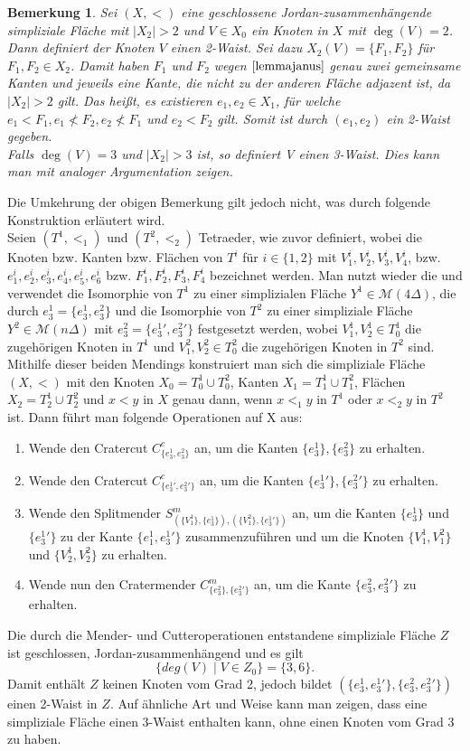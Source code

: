 \documentclass[12pt,titlepage,twoside,cleardoublepage]{article}
\theoremstyle{nummermitklammern}
\newtheorem{bemerkung}[temp]{Bemerkung}
\newtheorem{bemerkung}[zahl]{Bemerkung}
\numberwithin{equation}{section}
\begin{document}
\begin{bemerkung}
Sei $(X,<)$ eine geschlossene Jordan-zusammenhängende simpliziale Fläche mit $\vert X_2 \vert > 2$ und $V \in X_0$ ein Knoten in $X$ mit $\deg(V)=2$. Dann definiert der Knoten $V$ einen 2-Waist. Sei dazu $X_2(V)=\{F_1,F_2\}$ für $F_1,F_2 \in X_2$. Damit haben $F_1$ und $F_2$ wegen $\Cref{lemmajanus}$ genau zwei gemeinsame Kanten und jeweils eine Kante, die nicht zu der anderen Fläche adjazent ist, da $\vert X_2 \vert > 2$ gilt. Das heißt, es existieren $e_1,e_2\in X_1$, für welche $e_1<F_1,e_1 \nless F_2, e_2\nless F_1$ und $e_2  < F_2$ gilt. Somit ist durch $(e_1,e_2)$ ein 2-Waist gegeben.\\
Falls $\deg(V)=3$ und $\vert X_2 \vert>3$ ist, so definiert V einen 3-Waist. Dies kann man mit analoger Argumentation zeigen.\cite{withney}
\end{bemerkung}
 Die Umkehrung der obigen Bemerkung gilt jedoch nicht, was durch folgende Konstruktion erläutert wird.\\
 Seien $(T^1,<_1)$ und $(T^2,<_2)$ Tetraeder, wie zuvor definiert, wobei die Knoten bzw. Kanten bzw. Flächen von $T^i$ für $i\in \{1,2\}$ mit $V_1^i,V_2^i,V_3^i,V_4^i$, bzw. $e_1^i,e_2^i,e_3^i,e_4^i,e_5^i,e_6^i$ bzw. $F_1^i,F_2^i,F_3^i,F_4^i$ bezeichnet werden. Man nutzt wieder die  und verwendet die Isomorphie von  $T^1$ zu einer simplizialen Fläche $Y^1\in \mathcal{M}(4 \Delta)$, die durch $e_3^1 =\{e_3^1,e_3^2\}$ und die Isomorphie von $T^2$ zu einer simpliziale Fläche $Y^2\in \mathcal{M}(n\Delta)$ mit $e_3^2=\{{e_3^1}',{e_3^2}'\}$ festgesetzt werden, wobei $V_1^1,V_2^1 \in T^1_0$ die zugehörigen Knoten in $T^1$ und $V_1^2,V_2^2 \in T^2_0$ die zugehörigen Knoten in $T^2$ sind. Mithilfe dieser beiden Mendings konstruiert man sich die simpliziale Fläche $(X,<)$ mit den Knoten $X_0=T^1_0 \cup T^2_0$, Kanten $X_1=T^1_1 \cup T^2_1$, Flächen $X_2=T^1_2 \cup T^2_2$ und $x<y$ in $X$ genau dann, wenn $x<_1y$ in $T^1$ oder $x<_2 y$ in $T^2$ ist. Dann führt man folgende Operationen auf X aus:
 \begin{enumerate}
 \item Wende den Cratercut $C^c_{\{e_{3}^1,e_{3}^2\}}$ an, um die Kanten $\{e_3^1\},\{e_3^2\}$ zu erhalten.
 \item Wende den Cratercut $C^c_{\{{e_{3}^1}',{e_{3}^2}'\}}$ an, um die Kanten $\{{e_3^1}'\},\{{e_3^2}'\}$ zu erhalten.
\item Wende den Splitmender $S^m_{(\{V_1^1\},\{e_3^1\}),(\{V_1^2\},\{{e_3^1}'\})}$ an, um die Kanten $\{e_3^1\}$ und $\{{e_3^1}'\}$ zu der Kante $\{e_1^1,{e_3^1}'\}$ zusammenzuführen und um die Knoten $\{V_1^1,V_1^2\}$ und $\{V_2^1,V_2^2\}$ zu erhalten.
 \item Wende nun den Cratermender $C^m_{\{e_3^2\},\{{e_3^2}'\}}$ an, um die Kante $\{e_3^2,{e_3^2}'\}$ zu erhalten.
 \end{enumerate}
 Die durch die Mender- und Cutteroperationen entstandene simpliziale Fläche $Z$ ist geschlossen, Jordan-zusammenhängend und es gilt
 \[
 \{deg(V)\mid V\in Z_0\}=\{3,6\}.
 \] 
 Damit enthält $Z$ keinen Knoten vom Grad 2, jedoch bildet $(\{e_{3}^1,{e_{3}^1}'\},\{e_{3}^2,{e_{3}^2}'\})$ einen 2-Waist in $Z$. Auf ähnliche Art und Weise kann man zeigen, dass eine simpliziale Fläche einen 3-Waist enthalten kann, ohne einen Knoten vom Grad 3 zu haben.
\end{document}

